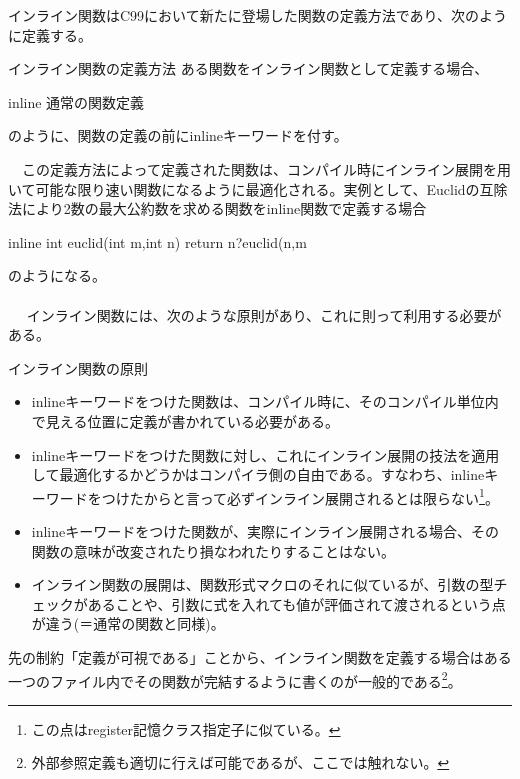 インライン関数はC99において新たに登場した関数の定義方法であり、次のように定義する。
\begin{itembox}[l]{インライン関数の定義方法}
ある関数をインライン関数として定義する場合、
\begin{code}
inline 通常の関数定義
\end{code}
のように、関数の定義の前にinlineキーワードを付す。
\end{itembox}
　この定義方法によって定義された関数は、コンパイル時にインライン展開を用いて可能な限り速い関数になるように最適化される。実例として、Euclidの互除法により2数の最大公約数を求める関数をinline関数で定義する場合
\begin{code}
inline int euclid(int m,int n){
  return n?euclid(n,m%
}
\end{code}
のようになる。
\\ \\　
インライン関数には、次のような原則があり、これに則って利用する必要がある。
\begin{itembox}[l]{インライン関数の原則}
\begin{itemize}
\item inlineキーワードをつけた関数は、コンパイル時に、そのコンパイル単位内で見える位置に定義が書かれている必要がある。
\item inlineキーワードをつけた関数に対し、これにインライン展開の技法を適用して最適化するかどうかはコンパイラ側の自由である。すなわち、inlineキーワードをつけたからと言って必ずインライン展開されるとは限らない\footnote{この点はregister記憶クラス指定子に似ている。}。
\item inlineキーワードをつけた関数が、実際にインライン展開される場合、その関数の意味が改変されたり損なわれたりすることはない。
\item インライン関数の展開は、関数形式マクロのそれに似ているが、引数の型チェックがあることや、引数に式を入れても値が評価されて渡されるという点が違う(＝通常の関数と同様)。
\end{itemize}
\end{itembox}
先の制約「定義が可視である」ことから、インライン関数を定義する場合はある一つのファイル内でその関数が完結するように書くのが一般的である\footnote{外部参照定義も適切に行えば可能であるが、ここでは触れない。}。

\newpage

